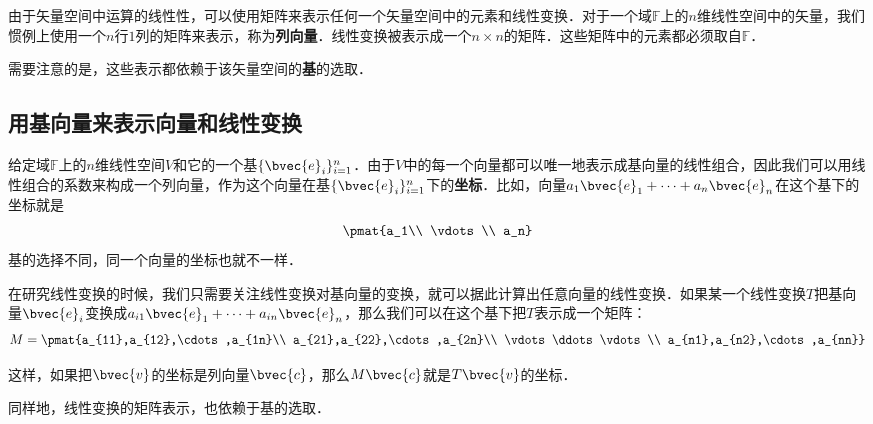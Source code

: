 
\begin{issues}
\end{issues}


由于矢量空间中运算的线性性，可以使用矩阵来表示任何一个矢量空间中的元素和线性变换．对于一个域$\mathbb{F}$上的$n$维线性空间中的矢量，我们惯例上使用一个$n$行$1$列的矩阵来表示，称为\textbf{列向量}．线性变换被表示成一个$n\times n$的矩阵．这些矩阵中的元素都必须取自$\mathbb{F}$．

需要注意的是，这些表示都依赖于该矢量空间的\textbf{基}的选取．


\subsection{用基向量来表示向量和线性变换}

给定域$\mathbb{F}$上的$n$维线性空间$V$和它的一个基$\{\bvec{e}_i\}_{i=1}^{n}$．由于$V$中的每一个向量都可以唯一地表示成基向量的线性组合，因此我们可以用线性组合的系数来构成一个列向量，作为这个向量在基$\{\bvec{e}_i\}_{i=1}^{n}$下的\textbf{坐标}．比如，向量$a_1\bvec{e}_1+\cdots+a_n\bvec{e}_n$在这个基下的坐标就是
\begin{equation}
\pmat{a_1\\ \vdots\\ a_n}
\end{equation}
基的选择不同，同一个向量的坐标也就不一样．

在研究线性变换的时候，我们只需要关注线性变换对基向量的变换，就可以据此计算出任意向量的线性变换．如果某一个线性变换$T$把基向量$\bvec{e}_i$变换成$a_{i1}\bvec{e}_1+\cdots+a_{in}\bvec{e}_n$，那么我们可以在这个基下把$T$表示成一个矩阵：
\begin{equation}
M=\pmat{a_{11},a_{12},\cdots,a_{1n}\\ a_{21},a_{22},\cdots,a_{2n}\\ \vdots\ddots\vdots\\ a_{n1},a_{n2},\cdots,a_{nn}}
\end{equation}

这样，如果把$\bvec{v}$的坐标是列向量$\bvec{c}$，那么$M\bvec{c}$就是$T\bvec{v}$的坐标．

同样地，线性变换的矩阵表示，也依赖于基的选取．